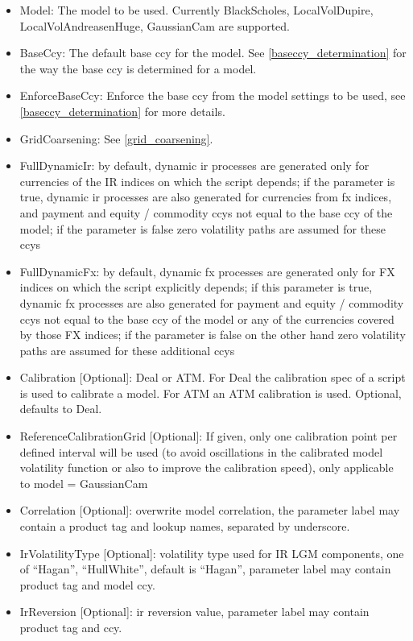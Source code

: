 \begin{itemize}
\item Model: The model to be used. Currently BlackScholes, LocalVolDupire, LocalVolAndreasenHuge, GaussianCam are
  supported.
\item BaseCcy: The default base ccy for the model. See \ref{baseccy_determination} for the way the base ccy is
  determined for a model.
\item EnforceBaseCcy: Enforce the base ccy from the model settings to be used, see \ref{baseccy_determination} for more
  details.
\item GridCoarsening: See \ref{grid_coarsening}.
\item FullDynamicIr: by default, dynamic ir processes are generated only for currencies of the IR indices on which the
  script depends; if the parameter is true, dynamic ir processes are also generated for currencies from fx indices, and
  payment and equity / commodity ccys not equal to the base ccy of the model; if the parameter is false zero volatility
  paths are assumed for these ccys
\item FullDynamicFx: by default, dynamic fx processes are generated only for FX indices on which the script explicitly
  depends; if this parameter is true, dynamic fx processes are also generated for payment and equity / commodity ccys
  not equal to the base ccy of the model or any of the currencies covered by those FX indices; if the parameter is false
  on the other hand zero volatility paths are assumed for these additional ccys
\item Calibration [Optional]: Deal or ATM. For Deal the calibration spec of a script is used to calibrate a model. For
  ATM an ATM calibration is used. Optional, defaults to Deal.
\item ReferenceCalibrationGrid [Optional]: If given, only one calibration point per defined interval will be used (to avoid
  oscillations in the calibrated model volatility function or also to improve the calibration speed), only applicable to
  model = GaussianCam
\item Correlation [Optional]: overwrite model correlation, the parameter label may contain a product tag and lookup names,
  separated by underscore.
\item IrVolatilityType [Optional]: volatility type used for IR LGM components, one of ``Hagan'', ``HullWhite'', default is
  ``Hagan'', parameter label may contain product tag and model ccy.
\item IrReversion [Optional]: ir reversion value, parameter label may contain product tag and ccy.

\end{itemize}
